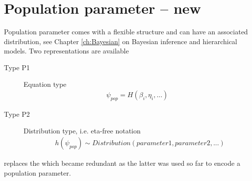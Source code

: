 \section{Population parameter -- new}
\label{sec:populationParameter}
Population parameter comes with a flexible structure and can have an 
associated distribution, see Chapter \ref{ch:Bayesian} on Bayesian inference 
and hierarchical models. Two representations are available 
\begin{description} 
\item[Type P1] Equation type
\begin{align*}
\psi_{pop} = H(\beta_i, \eta_i, ...)
\end{align*}
\item[Type P2] Distribution type, i.e. eta-free notation 
\begin{align*}
	& h(\psi_{pop}) \sim Distribution(parameter1, parameter2, ...)
\end{align*}
\end{description}

\begin{note} 
 replaces the  which 
became redundant as the \marginpar{\HandCuffLeft} latter was used so far 
to encode a population parameter.
\end{note} 


